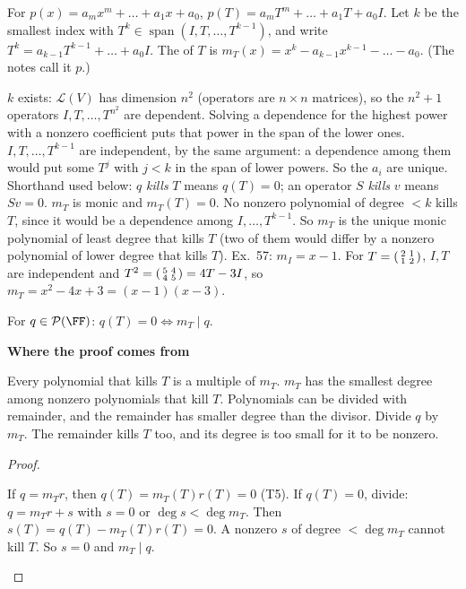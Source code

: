 \documentclass[10pt]{scrartcl}
\DeclareMathOperator{\spn}{span}
\newcommand{\LL}{\mathcal L}
\newcommand{\PP}{\mathcal P}
\newenvironment{motive}{\begin{mdframed}[style=thinkbox]\textbf{\color{OliveGreen!75!black}Where the proof comes from}\begin{description}[leftmargin=0.9em,labelindent=0pt,itemsep=2pt,topsep=2pt,font=\normalfont\bfseries\color{OliveGreen!70!black}]}{\end{description}\end{mdframed}}
\newenvironment{steps}{\begin{enumerate}[label=\arabic*.,leftmargin=1.5em,itemsep=2pt,topsep=2pt]}{\end{enumerate}}
\begin{document}
\begin{definition*}
  For $p(x)=a_mx^m+\dots+a_1x+a_0$, $p(T)=a_mT^m+\dots+a_1T+a_0I$. Let $k$ be the smallest index with $T^k\in\spn(I,T,\dots,T^{k-1})$, and write $T^k=a_{k-1}T^{k-1}+\dots+a_0I$. The  of $T$ is $m_T(x)=x^k-a_{k-1}x^{k-1}-\dots-a_0$. (The notes call it $p$.)
\end{definition*}
\begin{itemize}
  \ii $k$ exists: $\LL(V)$ has dimension $n^2$ (operators are $n\times n$ matrices), so the $n^2+1$ operators $I,T,\dots,T^{n^2}$ are dependent. Solving a dependence for the highest power with a nonzero coefficient puts that power in the span of the lower ones.
  \ii $I,T,\dots,T^{k-1}$ are independent, by the same argument: a dependence among them would put some $T^j$ with $j<k$ in the span of lower powers. So the $a_i$ are unique.
  \ii Shorthand used below: $q$ \emph{kills} $T$ means $q(T)=0$; an operator $S$ \emph{kills} $v$ means $Sv=0$.
  \ii $m_T$ is monic and $m_T(T)=0$. No nonzero polynomial of degree $<k$ kills $T$, since it would be a dependence among $I,\dots,T^{k-1}$. So $m_T$ is the unique monic polynomial of least degree that kills $T$ (two of them would differ by a nonzero polynomial of lower degree that kills $T$).
  \ii Ex.~57: $m_I=x-1$. For $T=\begin{psmallmatrix}2&1\\1&2\end{psmallmatrix}$, $I,T$ are independent and $T^2=\begin{psmallmatrix}5&4\\4&5\end{psmallmatrix}=4T-3I$, so $m_T=x^2-4x+3=(x-1)(x-3)$.
\end{itemize}

\begin{proposition*}
  For $q\in\PP(\FF)$: $q(T)=0\iff m_T\mid q$.
\end{proposition*}
\begin{motive}
  \ii[Want.] Every polynomial that kills $T$ is a multiple of $m_T$.
  \ii[Know.] $m_T$ has the smallest degree among nonzero polynomials that kill $T$. Polynomials can be divided with remainder, and the remainder has smaller degree than the divisor.
   Divide $q$ by $m_T$. The remainder kills $T$ too, and its degree is too small for it to be nonzero.
\end{motive}
\begin{proof}
  \begin{steps}
    \ii If $q=m_Tr$, then $q(T)=m_T(T)r(T)=0$ (T5).
    \ii If $q(T)=0$, divide: $q=m_Tr+s$ with $s=0$ or $\deg s<\deg m_T$. Then $s(T)=q(T)-m_T(T)r(T)=0$.
    \ii A nonzero $s$ of degree $<\deg m_T$ cannot kill $T$. So $s=0$ and $m_T\mid q$.
  \end{steps}
\end{proof}
\end{document}
